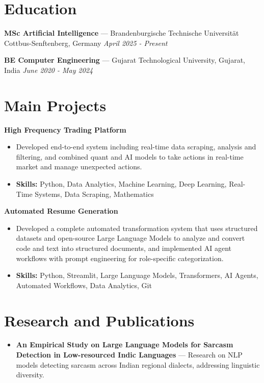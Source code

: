 \documentclass[a4paper,10pt]{article}
\begin{document}
\section*{Education}
\textbf{MSc Artificial Intelligence} — Brandenburgische Technische Universität Cottbus-Senftenberg, Germany \hfill \textit{April 2025 - Present}\par
\vspace{1.5pt}
\textbf{BE Computer Engineering} — Gujarat Technological University, Gujarat, India \hfill \textit{June 2020 - May 2024}\par

\section*{Main Projects}
\textbf{High Frequency Trading Platform}\par
\vspace{1pt}
\begin{itemize}
  \item Developed end-to-end system including real-time data scraping, analysis and filtering, and combined quant and AI models to take actions in real-time market and manage unexpected actions.
  \item \textbf{Skills:} Python, Data Analytics, Machine Learning, Deep Learning, Real-Time Systems, Data Scraping, Mathematics
\end{itemize}
\vspace{3pt}
\textbf{Automated Resume Generation}\par
\vspace{1pt}
\begin{itemize}
  \item Developed a complete automated transformation system that uses structured datasets and open-source Large Language Models to analyze and convert code and text into structured documents, and implemented AI agent workflows with prompt engineering for role-specific categorization.
  \item \textbf{Skills:} Python, Streamlit, Large Language Models, Transformers, AI Agents, Automated Workflows, Data Analytics, Git
\end{itemize}

\section*{Research and Publications}
\begin{itemize}
\item \textbf{An Empirical Study on Large Language Models for Sarcasm Detection in Low-resourced Indic Languages} — Research on NLP models detecting sarcasm across Indian regional dialects, addressing linguistic diversity.
\end{itemize}
\end{document}
